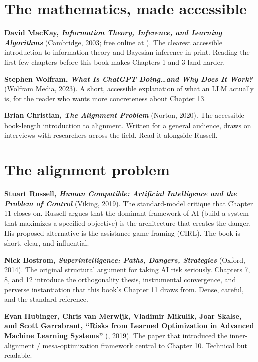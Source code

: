 \section*{The mathematics, made accessible}

\textbf{David MacKay, \textit{Information Theory, Inference, and Learning Algorithms}} (Cambridge, 2003; free online at ). The clearest accessible introduction to information theory and Bayesian inference in print. Reading the first few chapters before this book makes Chapters 1 and 3 land harder.

\textbf{Stephen Wolfram, \textit{What Is ChatGPT Doing\ldots and Why Does It Work?}} (Wolfram Media, 2023). A short, accessible explanation of what an LLM actually is, for the reader who wants more concreteness about Chapter 13.

\textbf{Brian Christian, \textit{The Alignment Problem}} (Norton, 2020). The accessible book-length introduction to alignment. Written for a general audience, draws on interviews with researchers across the field. Read it alongside Russell.

\section*{The alignment problem}

\textbf{Stuart Russell, \textit{Human Compatible: Artificial Intelligence and the Problem of Control}} (Viking, 2019). The standard-model critique that Chapter 11 closes on. Russell argues that the dominant framework of AI (build a system that maximizes a specified objective) is the architecture that creates the danger. His proposed alternative is the assistance-game framing (CIRL). The book is short, clear, and influential.

\textbf{Nick Bostrom, \textit{Superintelligence: Paths, Dangers, Strategies}} (Oxford, 2014). The original structural argument for taking AI risk seriously. Chapters 7, 8, and 12 introduce the orthogonality thesis, instrumental convergence, and perverse instantiation that this book's Chapter 11 draws from. Dense, careful, and the standard reference.

\textbf{Evan Hubinger, Chris van Merwijk, Vladimir Mikulik, Joar Skalse, and Scott Garrabrant, ``Risks from Learned Optimization in Advanced Machine Learning Systems''} (, 2019). The paper that introduced the inner-alignment / mesa-optimization framework central to Chapter 10. Technical but readable.

